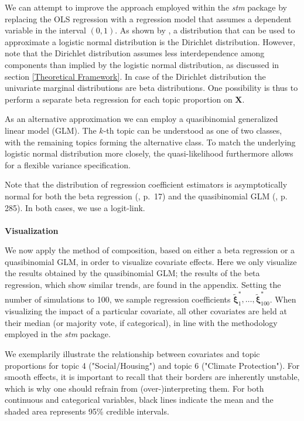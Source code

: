\noindent We can attempt to improve the approach employed within the \textit{stm} package by replacing the OLS regression with a regression model that assumes a dependent variable in the interval $(0,1)$. As shown by \cite{atchison1980logistic}, a distribution that can be used to approximate a logistic normal distribution is the Dirichlet distribution. However, note that the Dirichlet distribution assumes less interdependence among components than implied by the logistic normal distribution, as discussed in section \ref{Theoretical Framework}. In case of the Dirichlet distribution the univariate marginal distributions are beta distributions. One possibility is thus to perform a separate beta regression for each topic proportion on $\boldsymbol{X}$. 

As an alternative approximation we can employ a quasibinomial generalized linear model (GLM). The $k$-th topic can be understood as one of two classes, with the remaining topics forming the alternative class. To match the underlying logistic normal distribution more closely, the quasi-likelihood furthermore allows for a flexible variance specification. 

Note that the distribution of regression coefficient estimators is asymptotically normal for both the beta regression (\citealp{ferrari2004beta}, p.\ 17) and the quasibinomial GLM (\citealp{fahrmeir2007regression}, p. 285). In both cases, we use a logit-link. \\
\\
\noindent \textbf{Visualization} \vspace{10px}

\noindent We now apply the method of composition, based on either a beta regression or a quasibinomial GLM, in order to visualize covariate effects. Here we only visualize the results obtained by the quasibinomial GLM; the results of the beta regression, which show similar trends, are found in the appendix. Setting the number of simulations to 100, we sample regression coefficients $\tilde{\boldsymbol{\xi}}^*_1, \dots, \tilde{\boldsymbol{\xi}}^*_{100}$. When visualizing the impact of a particular covariate, all other covariates are held at their median (or majority vote, if categorical), in line with the methodology employed in the \textit{stm} package.

We exemplarily illustrate the relationship between covariates and topic proportions for topic 4 ("Social/Housing") and topic 6 ("Climate Protection"). For smooth effects, it is important to recall that their borders are inherently unstable, which is why one should refrain from (over-)interpreting them. For both continuous and categorical variables, black lines indicate the mean and the shaded area represents 95\% credible intervals.

